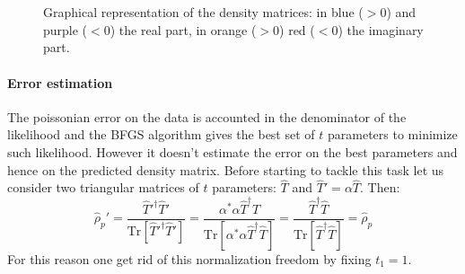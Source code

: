\documentclass[a4paper, 11pt]{article}
\begin{document}
      \begin{figure}
        \centering
        \begin{subfigure}[$\hat{\rho}^{(1)}$ via linear inversion]{
          \label{fig:tomo_li_1}}
        \end{subfigure}
        \begin{subfigure}[$\hat{\rho}^{(1)}$ via maximum likelihood]{
          \label{fig:tomo_ml_1}}
        \end{subfigure} \\
        \begin{subfigure}[$\hat{\rho}^{(2)}$ via linear inversion]{
          \label{fig:tomo_li_2}}
        \end{subfigure}
        \begin{subfigure}[$\hat{\rho}^{(2)}$ via maximum likelihood]{
          \label{fig:tomo_ml_2}}
        \end{subfigure} \\
        \begin{subfigure}[$\hat{\rho}^{(3)}$ via linear inversion]{
          \label{fig:tomo_li_3}}
        \end{subfigure}
        \begin{subfigure}[$\hat{\rho}^{(3)}$ via maximum likelihood]{
          \label{fig:tomo_ml_3}}
        \end{subfigure}
        \caption{Graphical representation of the density matrices: in blue ($>0$) and purple ($<0$) the real part, in orange ($>0$) red ($<0$) the imaginary part.}
      \end{figure}

      \paragraph{Error estimation}
        The poissonian error on the data is accounted in the denominator of the likelihood and the BFGS algorithm gives the best set of $t$ parameters to minimize such likelihood. However it doesn't estimate the error on the best parameters and hence on the predicted density matrix. Before starting to tackle this task let us consider two triangular matrices of $t$ parameters: $\hat{T}$ and $\hat{T}' = \alpha\hat{T}$. Then:
        \begin{equation*}
          \hat{\rho}_p' = \frac{\hat{T}'^\dagger \hat{T}'}{\text{Tr}[\hat{T}'^\dagger \hat{T}']}
          = \frac{\alpha^*\alpha\hat{T}^\dagger \hat{T}}{\text{Tr}[\alpha^*\alpha\hat{T}^\dagger \hat{T}]}
          = \frac{\hat{T}^\dagger \hat{T}}{\text{Tr}[\hat{T}^\dagger \hat{T}]}
          = \hat{\rho}_p
        \end{equation*}
        For this reason one get rid of this normalization freedom by fixing $t_1 = 1$.
\end{document}
